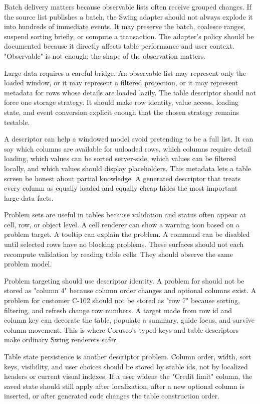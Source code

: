 Batch delivery matters because observable lists often receive grouped changes. If the source list publishes a batch, the Swing adapter should not always explode it into hundreds of immediate events. It may preserve the batch, coalesce ranges, suspend sorting briefly, or compute a transaction. The adapter's policy should be documented because it directly affects table performance and user context. "Observable" is not enough; the shape of the observation matters.

Large data requires a careful bridge. An observable list may represent only the loaded window, or it may represent a filtered projection, or it may represent metadata for rows whose details are loaded lazily. The table descriptor should not force one storage strategy. It should make row identity, value access, loading state, and event conversion explicit enough that the chosen strategy remains testable.

A descriptor can help a windowed model avoid pretending to be a full list. It can say which columns are available for unloaded rows, which columns require detail loading, which values can be sorted server-side, which values can be filtered locally, and which values should display placeholders. This metadata lets a table screen be honest about partial knowledge. A generated descriptor that treats every column as equally loaded and equally cheap hides the most important large-data facts.

Problem sets are useful in tables because validation and status often appear at cell, row, or object level. A cell renderer can show a warning icon based on a problem target. A tooltip can explain the problem. A command can be disabled until selected rows have no blocking problems. These surfaces should not each recompute validation by reading table cells. They should observe the same problem model.

Problem targeting should use descriptor identity. A problem for  should not be stored as "column 4" because column order changes and optional columns exist. A problem for customer C-102 should not be stored as "row 7" because sorting, filtering, and refresh change row numbers. A target made from row id and column key can decorate the table, populate a summary, guide focus, and survive column movement. This is where Corusco's typed keys and table descriptors make ordinary Swing renderers safer.

Table state persistence is another descriptor problem. Column order, width, sort keys, visibility, and user choices should be stored by stable ids, not by localized headers or current visual indexes. If a user widens the "Credit limit" column, the saved state should still apply after localization, after a new optional column is inserted, or after generated code changes the table construction order.

